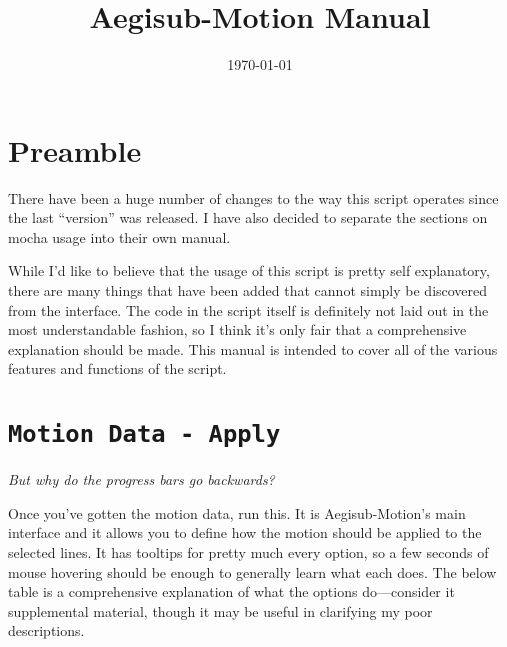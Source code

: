 ﻿\documentclass[a4paper,12pt]{article}
\title{Aegisub-Motion Manual}
\author{}
\date{\today}
\begin{document}
  \maketitle
  \tableofcontents
  \newpage
  \section{Preamble}
  There have been a huge number of changes to the way this script operates since the last ``version'' was released. I have also decided to separate the sections on mocha usage into their own manual.
  
  While I'd like to believe that the usage of this script is pretty self explanatory, there are many things that have been added that cannot simply be discovered from the interface. The code in the script itself is definitely not laid out in the most understandable fashion, so I think it's only fair that a comprehensive explanation should be made. This manual is intended to cover all of the various features and functions of the script.

  \section{{\tt{}Motion Data - Apply}}
  \emph{But why do the progress bars go backwards?}

  \medskip

  Once you've gotten the motion data, run this. It is Aegisub-Motion's main interface and it allows you to define how the motion should be applied to the selected lines. It has tooltips for pretty much every option, so a few seconds of mouse hovering should be enough to generally learn what each does. The below table is a comprehensive explanation of what the options do---consider it supplemental material, though it may be useful in clarifying my poor descriptions.

\end{document}
